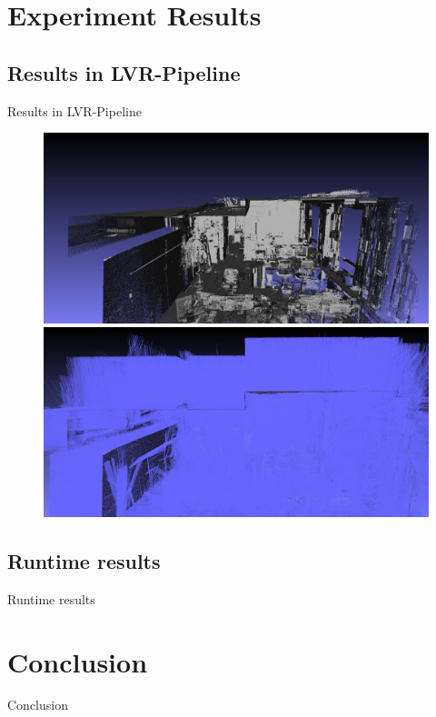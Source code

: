 \documentclass{beamer}
\begin{document}
\section{Experiment Results}
\subsection*{Results in LVR-Pipeline}
\begin{frame}{Results in LVR-Pipeline}
 \begin{figure}
  \centering
  \includegraphics[height=0.4\textheight]{Images/police_no_normals.png}\\
  \includegraphics[height=0.4\textheight]{Images/police_normals.png}
 \end{figure}

\end{frame}

\subsection*{Runtime results}
\begin{frame}{Runtime results}
 
\end{frame}

\section{Conclusion}
\begin{frame}{Conclusion}
 
\end{frame}
\end{document}
